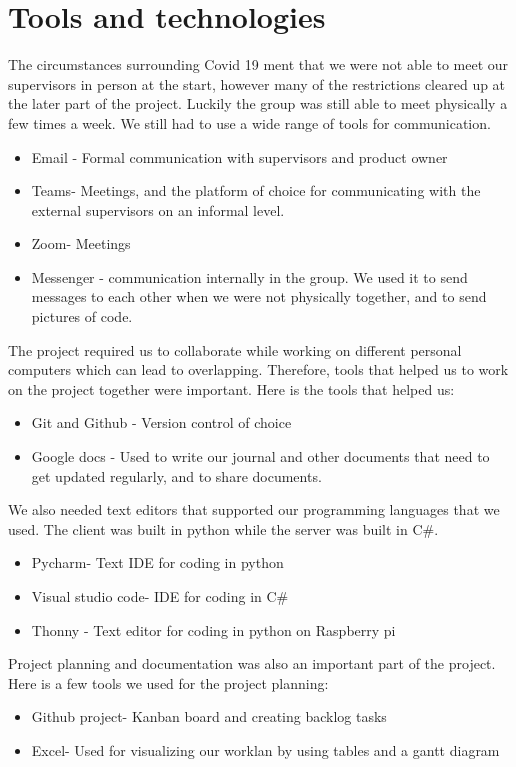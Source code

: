 \section{Tools and technologies}
The circumstances surrounding Covid 19 ment that we were not able to meet our supervisors in person at the start, however many of the restrictions cleared up at the later part of the project. Luckily the group was still able to meet physically a few times a week. We still had to use a wide range of tools for communication.
\begin{itemize}
	\item Email - Formal communication with supervisors and product owner
	\item Teams- Meetings, and the platform of choice for communicating with the external supervisors on an informal level. 
	\item Zoom- Meetings
	\item Messenger - communication internally in the group. We used it to send messages to each other when we were not physically together, and to send pictures of code. 
\end{itemize}

The project required us to collaborate while working on different personal computers which can lead to overlapping. Therefore, tools that helped us to work on the project together were important. Here is the tools that helped us:

\begin{itemize}
	\item Git and Github - Version control of choice
	\item Google docs - Used to write our journal and other documents that need to get updated regularly, and to share documents. 
\end{itemize}

We also needed text editors that supported our programming languages that we used. The client was built in python while the server was built in C\#. 

\begin{itemize}
	\item Pycharm- Text IDE for coding in python
	\item Visual studio code- IDE for coding in C\#
	\item Thonny - Text editor for coding in python on Raspberry pi
\end{itemize}

Project planning and documentation was also an important part of the project. Here is a few tools we used for the project planning:

\begin{itemize}
	\item Github project- Kanban board and creating backlog tasks
	\item Excel- Used for visualizing our worklan by using tables and a gantt diagram
\end{itemize}